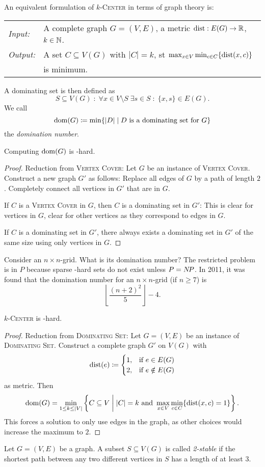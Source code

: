 \documentclass[../skript.tex]{subfiles}
\begin{document}
An equivalent formulation of \textsc{$k$-Center} in terms of graph theory is:
\begin{problem}[$k$-Center]
\begin{tabular}{@{}ll}
\textit{Input:} & A complete graph $G = (V, E)$, a metric $\operatorname*{dist} : E(G) \to \mathbb{R}$, $k \in \mathbb{N}$. \\
\textit{Output:} & A set $C \subseteq V(G)$ with $|C| = k$, \ac{st} $\max_{x \in V} \min_{c \in C} \{\operatorname*{dist}(x, c)\}$ \\
& is minimum.
\end{tabular}
\end{problem}
A dominating set is then defined as
\[
	S \subseteq V(G) \; : \; \forall x \in V \setminus S \; \exists s \in S \; : \; \{ x, s \} \in E(G).
\]
We call
\[
	\operatorname{dom}(G) \coloneqq \min \{ |D| \mid D \text{ is a dominating set for } G \}
\]
the \emph{domination number}.
\begin{theorem} %
\label{thm:23}
Computing $\operatorname{dom}(G)$ is \NP-hard.
\end{theorem}
\begin{proof}
Reduction from \textsc{Vertex Cover}: Let $G$ be an instance of \textsc{Vertex Cover}.
Construct a new graph $G'$ as follows: Replace all edges of $G$ by a path of length $2$.
Completely connect all vertices in $G'$ that are in $G$.

If $C$ is a \textsc{Vertex Cover} in $G$, then $C$ is a dominating set in $G'$: This is clear for vertices in $G$, clear for other vertices as they correspond to edges in $G$.

If $C$ is a dominating set in $G'$, there always  exists a dominating set in $G'$ of the same size using only vertices in $G$.
\end{proof}
Consider an $n \times n$-grid. What is its domination number? The restricted problem is in $P$ because sparse \NP-hard sets do not exist unless $P = N \! P$.
In 2011, it was found that the domination number for an $n \times n$-grid (if $n \geq 7$) is
\[
	\left\lfloor \frac{(n+2)^2}{5} \right\rfloor - 4.
\]
\begin{theorem} %
\label{thm:24}
\textsc{$k$-Center} is \NP-hard.
\end{theorem}
\begin{proof}
Reduction from \textsc{Dominating Set}: Let $G = (V, E)$ be an instance of \textsc{Dominating Set}.
Construct a complete graph $G'$ on $V(G)$ with
\[
\operatorname*{dist}(e) \coloneqq \begin{cases}
1, & \text{if } e \in E(G) \\
2, & \text{if } e \notin E(G)
\end{cases}
\]
as metric.
Then
\[
	\operatorname{dom}(G) = \min_{1 \leq k \leq |V|} \left\{ C \subseteq V \mathrel{}\middle|\mathrel{} |C| = k \text{ and } \max_{x \in V} \min_{c \in C} \{ \operatorname*{dist}(x, c) = 1 \} \right\}.
\]
This forces a solution to only use edges in the graph, as other choices would increase the maximum to $2$.
\end{proof}
Let $G = (V, E)$ be a graph. A subset $S \subseteq V(G)$ is called \emph{2-stable} if the shortest path between any two different vertices in $S$ has a length of at least $3$.
\end{document}
